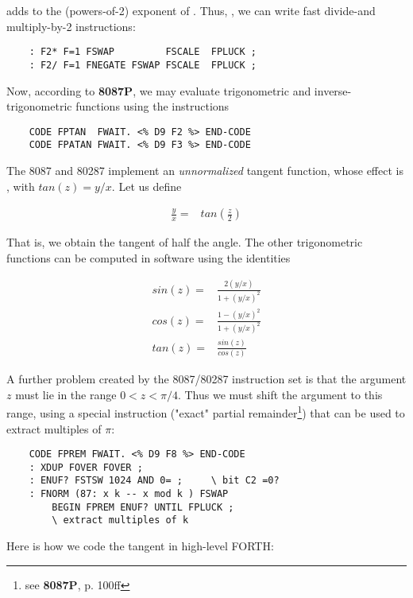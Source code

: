  adds  to the (powers-of-2) exponent of . Thus, \eg, we can write fast divide-and multiply-by-2 instructions:

\begin{lstlisting}
    : F2* F=1 FSWAP         FSCALE  FPLUCK ;
    : F2/ F=1 FNEGATE FSWAP FSCALE  FPLUCK ;
\end{lstlisting}

Now, according to \textbf{8087P}, we may evaluate trigonometric and inverse-trigonometric functions using the instructions

\begin{lstlisting}
    CODE FPTAN  FWAIT. <% D9 F2 %> END-CODE
    CODE FPATAN FWAIT. <% D9 F3 %> END-CODE
\end{lstlisting}

The 8087 and 80287 implement an \textit{unnormalized} tangent function, whose effect is , with $tan(z)=y/x$. Let us define

\begin{align} 
    \frac{y}{x} =& tan(\frac{z}{2})
\end{align}

That is, we obtain the tangent of half the angle. The other trigonometric functions can be computed in software using the identities

\begin{align}
    sin(z) =& \frac{2(y/x)}{1 + (y/x)^{2}}       \\
    cos(z) =& \frac{1 - (y/x)^2}{1 + (y/x)^2}   \\
    tan(z) =& \frac{sin(z)}{cos(z)}
\end{align}

A further problem created by the 8087/80287 instruction set is that the argument $z$ must lie in the range $0 < z < \pi/4$. Thus we must shift the argument to this range, using a special instruction  ("exact" partial remainder\footnote{see \textbf{8087P}, p. 100ff}) that can be used to extract multiples of $\pi$:

\begin{lstlisting}
    CODE FPREM FWAIT. <% D9 F8 %> END-CODE
    : XDUP FOVER FOVER ;
    : ENUF? FSTSW 1024 AND 0= ;     \ bit C2 =0?
    : FNORM (87: x k -- x mod k ) FSWAP
        BEGIN FPREM ENUF? UNTIL FPLUCK ;
        \ extract multiples of k
\end{lstlisting}

Here is how we code the tangent in high-level FORTH:

